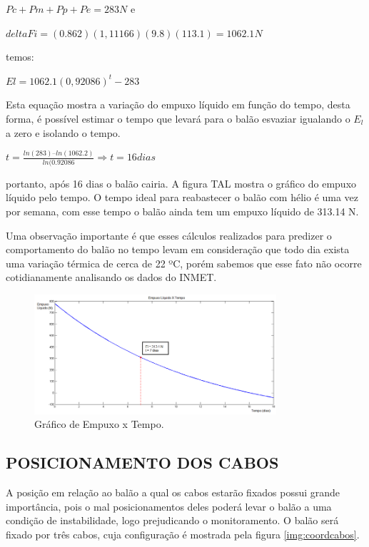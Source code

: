 	 $Pc + Pm + Pp+Pe = 283 N$   e

	 $deltaFi = (0.862)(1,11166)(9.8)(113.1) = 1062.1 N$

	temos:

	 $El = 1062.1(0,92086)^t - 283$

	Esta equação mostra a variação do empuxo líquido em função do tempo, desta forma, é possível estimar o tempo que levará para o balão esvaziar igualando o $E_l$ a zero e isolando o tempo.

	$t = \frac{ln(283) – ln(1062.2)}{ln(0.92086} \Rightarrow t = 16 dias$

	portanto, após 16 dias o balão cairia. A figura TAL mostra o gráfico do empuxo líquido pelo tempo. O tempo ideal para reabastecer o balão com hélio é uma vez por semana, com esse tempo o balão ainda tem um empuxo líquido de 313.14 N.

	Uma observação importante é que esses cálculos realizados para predizer o comportamento do balão no tempo levam em consideração que todo dia exista uma variação térmica de cerca de 22 ºC, porém sabemos que esse fato não ocorre cotidianamente analisando os dados do INMET.


	\begin{figure}[H]
		\centering
		\includegraphics[width=0.8\textwidth]{figuras/empuxoLiquidoTempo}
		\caption{Gráfico de Empuxo x Tempo.}
		\label{img:empuxoLiquidoTempo}
	\end{figure}


\subsection{POSICIONAMENTO DOS CABOS}

	A posição em relação ao balão a qual os cabos estarão fixados possui grande importância, pois o mal posicionamentos deles poderá levar o balão a uma condição de instabilidade, logo prejudicando o monitoramento. O balão será fixado por três cabos, cuja  configuração é mostrada pela figura \ref{img:coordcabos}.

